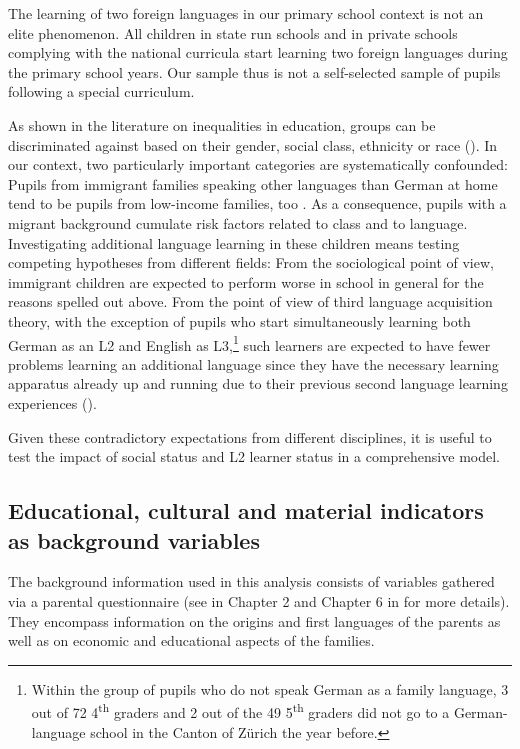 \documentclass[output=paper]{langsci/langscibook}
\begin{document}
The learning of two foreign languages in our primary school context is not an elite phenomenon. All children in state run schools and in private schools complying with the national curricula start learning two foreign languages during the primary school years. Our sample thus is not a self-selected sample of pupils following a special curriculum. 

As shown in the literature on inequalities in education, groups can be discriminated against based on their gender, social class, ethnicity or race (\citealt{LucasIrwin2018}). In our context, two particularly important categories are systematically confounded: Pupils from immigrant families speaking other languages than German at home tend to be pupils from low-income families, too \citep{Kronig2003}. As a consequence, pupils with a migrant background cumulate risk factors related to class and to language. Investigating additional language learning in these children means testing competing hypotheses from different fields: From the sociological point of view, immigrant children are expected to perform worse in school in general for the reasons spelled out above. From the point of view of third language acquisition theory, with the exception of pupils who start simultaneously learning both German as an L2 and English as L3,\footnote{Within the group of pupils who do not speak German as a family language, 3 out of 72 4\textsuperscript{th} graders and 2 out of the 49 5\textsuperscript{th} graders did not go to a German-language school in the Canton of Zürich the year before.} such learners are expected to have fewer problems learning an additional language since they have the necessary learning apparatus already up and running due to their previous second language learning experiences (\citealt{HerdinaJessner2002}).

Given these contradictory expectations from different disciplines, it is useful to test the impact of social status and L2 learner status in a comprehensive model.

\subsection{Educational, cultural and material indicators as background variables}

The background information used in this analysis consists of variables gathered via a parental questionnaire (see  in Chapter 2 and Chapter 6 in \citealt{Vanhove2021} for more details). They encompass information on the origins and first languages of the parents as well as on economic and educational aspects of the families.
\end{document}
